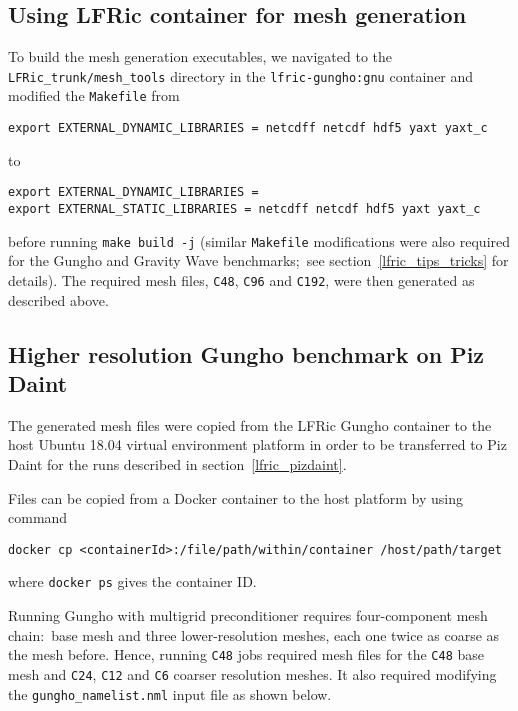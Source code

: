 \documentclass[twoside,a4paper,12pt]{article}
\begin{document}
\subsection{Using LFRic container for mesh generation}\label{lfric_container_mesh}

To build the mesh generation executables, we navigated to the
\texttt{LFRic\_trunk/mesh\_tools} directory in the \texttt{lfric-gungho:gnu}
container and modified the \texttt{Makefile} from
\begin{Verbatim}[fontsize=\small]
export EXTERNAL_DYNAMIC_LIBRARIES = netcdff netcdf hdf5 yaxt yaxt_c
\end{Verbatim}
to
\begin{Verbatim}[fontsize=\small]
export EXTERNAL_DYNAMIC_LIBRARIES =
export EXTERNAL_STATIC_LIBRARIES = netcdff netcdf hdf5 yaxt yaxt_c
\end{Verbatim}
before running \texttt{make build -j} (similar \texttt{Makefile} modifications
were also required for the Gungho and Gravity Wave benchmarks;\ see
section~\ref{lfric_tips_tricks} for details). The required mesh files,
\texttt{C48}, \texttt{C96} and \texttt{C192}, were then generated as described
above.
%
%
\subsection{Higher resolution Gungho benchmark on Piz Daint}\label{lfric_pizdaint_high}

The generated mesh files were copied from the LFRic Gungho container to the host
Ubuntu 18.04 virtual environment platform in order to be transferred to
Piz Daint for the runs described in section~\ref{lfric_pizdaint}.

Files can be copied from a Docker container to the host platform by using command
\begin{Verbatim}[fontsize=\small]
docker cp <containerId>:/file/path/within/container /host/path/target
\end{Verbatim}
where \texttt{docker ps} gives the container ID.

Running Gungho with multigrid preconditioner requires four-component mesh chain:\
base mesh and three lower-resolution meshes, each one twice as coarse as the
mesh before. Hence, running \texttt{C48} jobs required mesh files for the
\texttt{C48} base mesh and \texttt{C24}, \texttt{C12} and \texttt{C6} coarser
resolution meshes. It also required modifying the \texttt{gungho\_namelist.nml}
input file as shown below.
\end{document}
